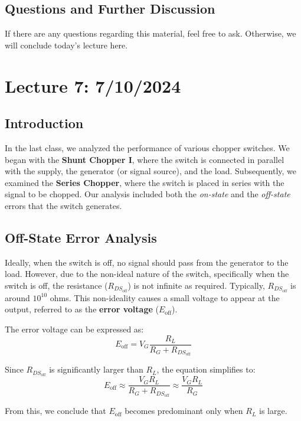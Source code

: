 \subsection{Questions and Further Discussion}

If there are any questions regarding this material, feel free to ask. Otherwise, we will conclude today's lecture here.
\newpage
\section{Lecture 7: 7/10/2024}

\subsection{Introduction}
In the last class, we analyzed the performance of various chopper switches. We began with the \textbf{Shunt Chopper I}, where the switch is connected in parallel with the supply, the generator (or signal source), and the load. Subsequently, we examined the \textbf{Series Chopper}, where the switch is placed in series with the signal to be chopped. Our analysis included both the \textit{on-state} and the \textit{off-state} errors that the switch generates.

\subsection{Off-State Error Analysis}
Ideally, when the switch is off, no signal should pass from the generator to the load. However, due to the non-ideal nature of the switch, specifically when the switch is off, the resistance (\( R_{DS_{\text{off}}} \)) is not infinite as required. Typically, \( R_{DS_{\text{off}}} \) is around \(10^{10}\) ohms. This non-ideality causes a small voltage to appear at the output, referred to as the \textbf{error voltage} (\( E_{\text{off}} \)).

The error voltage can be expressed as:
\begin{equation}
E_{\text{off}} = V_G \frac{R_L}{R_G + R_{DS_{\text{off}}}}
\end{equation}

Since \( R_{DS_{\text{off}}} \) is significantly larger than \( R_L \), the equation simplifies to:
\begin{equation}
E_{\text{off}} \approx \frac{V_G R_L}{R_G + R_{DS_{\text{off}}}} \approx \frac{V_G R_L}{R_G}
\end{equation}

From this, we conclude that \( E_{\text{off}} \) becomes predominant only when \( R_L \) is large.

